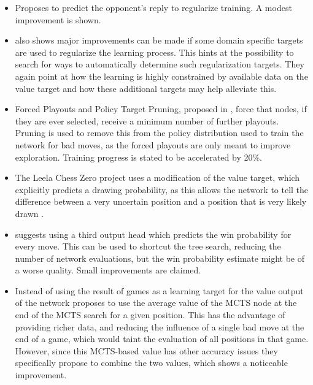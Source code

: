 \documentclass[12pt,onecolumn,oneside,titlepage]{article}
\begin{document}
\begin{itemize}
 \item \cite{wu2019accelerating} Proposes to predict the opponent's reply to regularize training. A modest improvement is shown.
 \item \cite{wu2019accelerating} also shows major improvements can be made if some domain specific targets are used to regularize the learning process. This hints at the possibility to search for ways to automatically determine such regularization targets.
 They again point at how the learning is highly constrained by available data on the value target and how these additional targets may help alleviate this.
 \item Forced Playouts and Policy Target Pruning, proposed in \cite{wu2019accelerating}, force that nodes, if they are ever selected, receive a minimum number of further playouts. Pruning is used to remove this from the policy distribution used to train the network for bad moves,
 as the forced playouts are only meant to improve exploration. Training progress is stated to be accelerated by 20\%.
 \item The Leela Chess Zero project uses a modification of the value target, which explicitly predicts a drawing probability, as this allows the network to tell the difference between a very uncertain position and a position that is very likely drawn \cite{leela0wdl}.
 \item \cite{anonymous2020threehead} suggests using a third output head which predicts the win probability for every move. This can be used to shortcut the tree search, reducing the number of network evaluations, but the win probability estimate might be of a worse quality.
  Small improvements are claimed.
 \item Instead of using the result of games as a learning target for the value output of the network \cite{oracledevs6} proposes to use the average value of the MCTS node at the end of the MCTS search for a given position. This has the advantage of providing richer data,
 and reducing the influence of a single bad move at the end of a game, which would taint the evaluation of all positions in that game. However, since this MCTS-based value has other accuracy issues they specifically propose to combine the two values, which shows a noticeable improvement.
\end{itemize}
\end{document}
